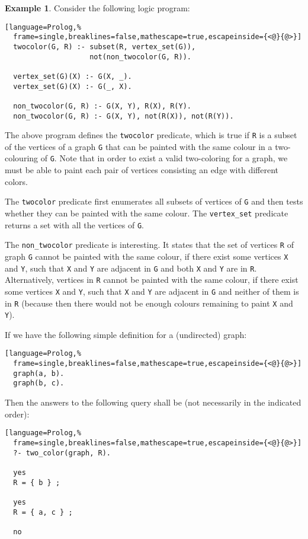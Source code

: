\documentclass[inscr,ack,preface]{dithesis}
\theoremstyle{definition}
\newtheorem{example}{Example}[chapter]
\begin{document}
\begin{example} \label{ex:twocolor}
Consider the following logic program:
\begin{lstlisting}[language=Prolog,%
  frame=single,breaklines=false,mathescape=true,escapeinside={<@}{@>}]
  twocolor(G, R) :- subset(R, vertex_set(G)),
                    not(non_twocolor(G, R)).

  vertex_set(G)(X) :- G(X, _).
  vertex_set(G)(X) :- G(_, X).

  non_twocolor(G, R) :- G(X, Y), R(X), R(Y).
  non_twocolor(G, R) :- G(X, Y), not(R(X)), not(R(Y)).
\end{lstlisting}
The above program defines the \texttt{twocolor} predicate, which is true if \texttt{R} is a subset of the vertices of a graph \texttt{G} that can be painted with the same colour in a two-colouring of \texttt{G}. Note that in order to exist a valid two-coloring for a graph, we must be able to paint each pair of vertices consisting an edge with different colors.

The \texttt{twocolor} predicate first enumerates all subsets of vertices of \texttt{G} and then tests whether they can be painted with the same colour. The \texttt{vertex\_set} predicate returns a set with all the vertices of \texttt{G}.

The \texttt{non\_twocolor} predicate is interesting. It states that the set of vertices \texttt{R} of graph \texttt{G} cannot be painted with the same colour, if there exist some vertices \texttt{X} and \texttt{Y}, such that \texttt{X} and \texttt{Y} are adjacent in \texttt{G} and both \texttt{X} and \texttt{Y} are in \texttt{R}. Alternatively, vertices in \texttt{R} cannot be painted with the same colour, if there exist some vertices \texttt{X} and \texttt{Y}, such that \texttt{X} and \texttt{Y} are adjacent in \texttt{G} and neither of them is in \texttt{R} (because then there would not be enough colours remaining to paint \texttt{X} and \texttt{Y}).

If we have the following simple definition for a (undirected) graph:
\begin{lstlisting}[language=Prolog,%
  frame=single,breaklines=false,mathescape=true,escapeinside={<@}{@>}]
  graph(a, b).
  graph(b, c).
\end{lstlisting}

Then the answers to the following query shall be (not necessarily in the indicated order):
\begin{lstlisting}[language=Prolog,%
  frame=single,breaklines=false,mathescape=true,escapeinside={<@}{@>}]
  ?- two_color(graph, R).

  yes
  R = { b } ;

  yes
  R = { a, c } ;

  no
\end{lstlisting}
\end{example}
\end{document}
